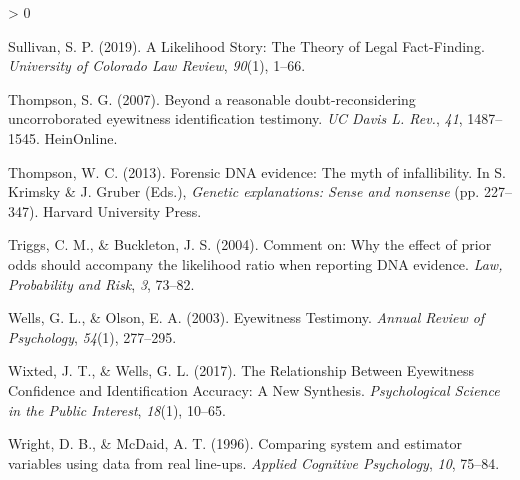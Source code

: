 \documentclass[
  10pt,
  dvipsnames,enabledeprecatedfontcommands]{scrartcl}
\newlength{\cslhangindent}
\newenvironment{CSLReferences}[2] %
 {%
  \setlength{\parindent}{0pt}
  \ifodd #1 \everypar{\setlength{\hangindent}{\cslhangindent}}\ignorespaces\fi
  \ifnum #2 > 0
  \setlength{\parskip}{#2\baselineskip}
  \fi
 }%
 {}
\begin{document}
\begin{CSLReferences}{1}{0}
\leavevmode\hypertarget{ref-sullivan2016LikelihoodStoryTheory}{}%
Sullivan, S. P. (2019). A {Likelihood Story}: {The Theory} of {Legal
Fact}-{Finding}. \emph{University of Colorado Law Review}, \emph{90}(1),
1--66.

\leavevmode\hypertarget{ref-thompson2007beyond}{}%
Thompson, S. G. (2007). Beyond a reasonable doubt-reconsidering
uncorroborated eyewitness identification testimony. \emph{UC Davis L.
Rev.}, \emph{41}, 1487--1545. HeinOnline.

\leavevmode\hypertarget{ref-thompson2012forensic}{}%
Thompson, W. C. (2013). Forensic DNA evidence: The myth of
infallibility. In S. Krimsky \& J. Gruber (Eds.), \emph{Genetic
explanations: Sense and nonsense} (pp. 227--347). Harvard University
Press.

\leavevmode\hypertarget{ref-triggsCommentWhyEffect}{}%
Triggs, C. M., \& Buckleton, J. S. (2004). Comment on: {Why} the effect
of prior odds should accompany the likelihood ratio when reporting {DNA}
evidence. \emph{Law, Probability and Risk}, \emph{3}, 73--82.

\leavevmode\hypertarget{ref-wells2003EyewitnessTestimony}{}%
Wells, G. L., \& Olson, E. A. (2003). Eyewitness {Testimony}.
\emph{Annual Review of Psychology}, \emph{54}(1), 277--295.

\leavevmode\hypertarget{ref-wixted2017RelationshipEyewitnessConfidence}{}%
Wixted, J. T., \& Wells, G. L. (2017). The {Relationship Between
Eyewitness Confidence} and {Identification Accuracy}: {A New Synthesis}.
\emph{Psychological Science in the Public Interest}, \emph{18}(1),
10--65.

\leavevmode\hypertarget{ref-Wright1996ComparingSystemEstimator}{}%
Wright, D. B., \& McDaid, A. T. (1996). Comparing system and estimator
variables using data from real line-ups. \emph{Applied Cognitive
Psychology}, \emph{10}, 75--84.

\end{CSLReferences}
\end{document}
